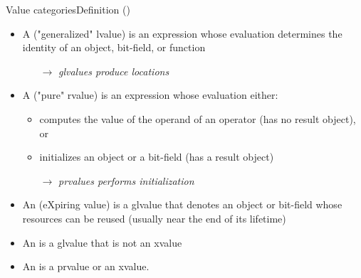 \begin{frame}{Value categories}{Definition ()}
  \begin{definitions}
    \begin{itemize}
    \item
      A  ("generalized" lvalue) is an expression whose evaluation determines the identity of an object, bit-field, or function
      \begin{itemize}
      \item[$\to$]
        \emph{glvalues produce locations}
      \end{itemize}
    \item
      A  ("pure" rvalue) is an expression whose evaluation either:
      \begin{itemize}
      \item
        computes the value of the operand of an operator (has no result object), or
      \item
        initializes an object or a bit-field (has a result object)
      \item[$\to$]
        \emph{prvalues performs initialization}
      \end{itemize}
    \item
      An  (eXpiring value) is a glvalue that denotes an object or bit-field whose resources can be reused (usually near the end of its lifetime)
    \item
      An  is a glvalue that is not an xvalue
    \item
      An  is a prvalue or an xvalue.
    \end{itemize}
  \end{definitions}
\end{frame}

